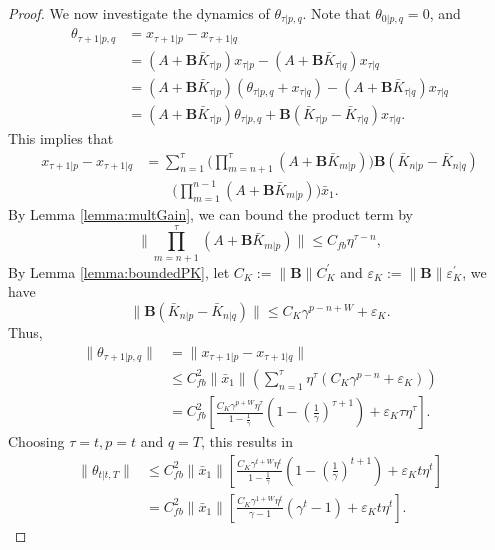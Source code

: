 \documentclass[letterpaper, 10 pt, conference]{ieeeconf}  %
\newcommand{\BK}[1]{\mathbf{B}\bar{K}_{#1}}
\begin{document}
\begin{proof}
We now investigate the dynamics of $\theta_{\tau|p,q}$. Note that $\theta_{0|p,q} = 0$, and 
\begin{align*}
    \theta_{\tau+1|p,q} &= x_{\tau+1|p} - x_{\tau+1|q}\\
    &= (A+\BK{\tau|p})x_{\tau|p}-(A+\BK{\tau|q})x_{\tau|q}\\
    &= (A+\BK{\tau|p})(\theta_{\tau|p,q}+x_{\tau|q})-(A+\BK{\tau|q})x_{\tau|q}\\
    &= (A+\BK{\tau|p})\theta_{\tau|p,q} + \mathbf{B}(\bar{K}_{\tau|p}-\bar{K}_{\tau|q})x_{\tau|q}.
\end{align*}
This implies that
\begin{align*}
    x_{\tau+1|p} - x_{\tau+1|q} &= \sum_{n=1}^{\tau}\bigg(\prod_{m=n+1}^{\tau}(A+\BK{m|p})\bigg)\mathbf{B}(\bar{K}_{n|p}-\bar{K}_{n|q})\\
        &\qquad \bigg(\prod_{m=1}^{n-1}(A+\BK{m|p})\bigg)\bar{x}_{1}.
\end{align*}
By Lemma \ref{lemma:multGain}, we can bound the product term by
\begin{equation*}
    \| \prod_{m=n+1}^{\tau}(A+\BK{m|p})\| \leq C_{fb}\eta^{\tau-n},
\end{equation*}
By Lemma \ref{lemma:boundedPK}, let $C_{K} := \|\mathbf{B}\|C_{K}^{'}$ and $\varepsilon_{K} := \|\mathbf{B}\|\varepsilon_{K}^{'}$, we have
\begin{equation*}
    \|\mathbf{B}(\bar{K}_{n|p}-\bar{K}_{n|q})\| \leq C_{K}\gamma^{p-n+W}+\varepsilon_{K}.
\end{equation*}
Thus,
\begin{align*}
    \|\theta_{\tau+1|p,q}\| &= \|x_{\tau+1|p}-x_{\tau+1|q}\|\\
    &\leq C_{fb}^{2}\|\bar{x}_{1}\|(\sum_{n=1}^{\tau}\eta^{\tau}(C_{K}\gamma^{p-n}+\varepsilon_{K}))\\
    &= C_{fb}^{2}[\frac{C_{K}\gamma^{p+W}\eta^{\tau}}{1-\frac{1}{\gamma}}(1-(\frac{1}{\gamma})^{\tau+1})+ \varepsilon_{K}\tau\eta^{\tau}].
\end{align*}
Choosing $\tau = t,p = t$ and $q = T$, this results in
\begin{align*}
    \|\theta_{t|t,T}\| &\leq C^{2}_{fb}\|\bar{x}_{1}\|[\frac{C_{K}\gamma^{t+W}\eta^{t}}{1-\frac{1}{\gamma}}(1-(\frac{1}{\gamma})^{t+1}) + \varepsilon_{K}t\eta^{t}]\\
    &= C^{2}_{fb}\|\bar{x}_{1}\|[\frac{C_{K}\gamma^{1+W}\eta^{t}}{\gamma-1}(\gamma^{t}-1) + \varepsilon_{K}t\eta^{t}].
\end{align*}


\end{proof}
\end{document}
